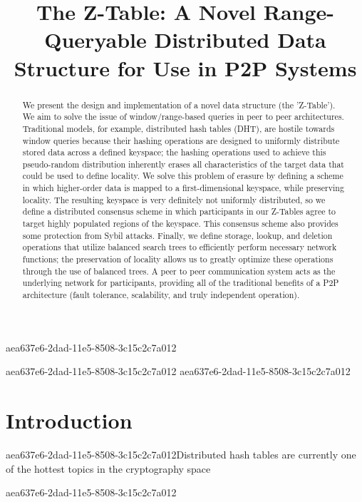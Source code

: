\documentclass[12pt]{article}
\title{The Z-Table: A Novel Range-Queryable Distributed Data Structure for Use in P2P Systems}
\begin{document}
aea637e6-2dad-11e5-8508-3c15c2c7a012\maketitle

\begin{abstract}
We present the design and implementation of a novel data structure (the 'Z-Table'). We aim to solve the issue of window/range-based queries in peer to peer architectures. Traditional models, for example,  distributed hash tables (DHT), are hostile towards window queries because their hashing operations are designed to uniformly distribute stored data across a defined keyspace; the hashing operations used to achieve this pseudo-random distribution inherently erases all characteristics of the target data that could be used to define locality. We solve this problem of erasure by defining a scheme in which higher-order data is mapped to a first-dimensional keyspace, while preserving locality. The resulting keyspace is very definitely not uniformly distributed, so we define a distributed consensus scheme in which participants in our Z-Tables agree to target highly populated regions of the keyspace. This consensus scheme also provides some protection from Sybil attacks. Finally, we define storage, lookup, and deletion operations that utilize balanced search trees to efficiently perform necessary network functions; the preservation of locality allows us to greatly optimize these operations through the use of balanced trees. A peer to peer communication system acts as the underlying network for participants, providing all of the traditional benefits of a P2P architecture (fault tolerance, scalability, and truly independent operation).
\end{abstract}

aea637e6-2dad-11e5-8508-3c15c2c7a012
aea637e6-2dad-11e5-8508-3c15c2c7a012\newpage
\section{Introduction}
aea637e6-2dad-11e5-8508-3c15c2c7a012Distributed hash tables are currently one of the hottest topics in the cryptography space~\cite{Stoica:2001dj,Rowstron:2001ea,Ratnasamy:2001wn}

\printbibliography
aea637e6-2dad-11e5-8508-3c15c2c7a012
\end{document}
